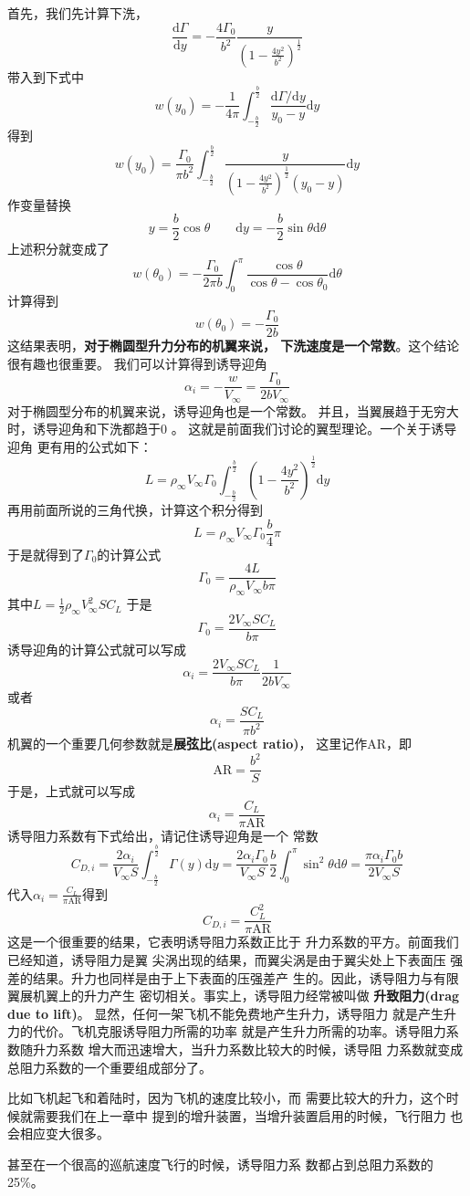 首先，我们先计算下洗，
\[
  \frac{\mathrm{d}\Gamma}{\mathrm{d}y}
  =-\frac{4\Gamma_0}{b^2}
  \frac{y}{\left(1-\frac{4y^2}{b^2}\right)^{\frac{1}{2}}}
\]
带入到下式中
\[
  w(y_0)=-\frac{1}{4\pi}
  \int _{-\frac{b}{2}}^{\frac{b}{2}}
  \frac{\mathrm{d}\Gamma / \mathrm{d}y}{y_0-y}\mathrm{d}y
\]
得到
\[
  w(y_0)=\frac{\Gamma_0}{\pi b^2}
  \int _{-\frac{b}{2}}^{\frac{b}{2}}
  \frac{y}{\left(1-\frac{4y^2}{b^2}\right)^{\frac{1}{2}}(y_0-y)}\mathrm{d}y
\]
作变量替换
\[
  y=\frac{b}{2}\cos \theta \qquad \mathrm{d}y=-\frac{b}{2}\sin \theta \mathrm{d}\theta
\]
上述积分就变成了
\[
  w(\theta_0)=-\frac{\Gamma_0}{2 \pi b }
  \int _0 ^\pi \frac{\cos \theta}{\cos \theta-\cos \theta_0}\mathrm{d} \theta
\]
计算得到
\[
  w(\theta_0)=-\frac{\Gamma_0}{2b}
\]
这结果表明，{\color{noteorange}\bfseries 对于椭圆型升力分布的机翼来说，
下洗速度是一个常数}。这个结论很有趣也很重要。
我们可以计算得到诱导迎角
\[
  \alpha_i=-\frac{w }{V_\infty }= \frac{\Gamma_0}{2 b V_\infty}
\]
对于椭圆型分布的机翼来说，诱导迎角也是一个常数。
并且，当翼展趋于无穷大时，诱导迎角和下洗都趋于0 。
这就是前面我们讨论的翼型理论。一个关于诱导迎角
更有用的公式如下：
\[
  L=\rho_\infty V_\infty \Gamma_0 
  \int _{-\frac{b}{2}}^{\frac{b}{2}}
  \left(1-\frac{4y^2}{b^2}\right)^{\frac{1}{2}}
  \mathrm{d}y
\]
再用前面所说的三角代换，计算这个积分得到
\[
  L=\rho_\infty V_\infty \Gamma_0 \frac{b}{4}\pi
\]
于是就得到了$\Gamma_0$的计算公式
\[
  \Gamma_0=\frac{4L}{\rho_\infty V_\infty b \pi}
\]
其中$L=\frac{1}{2}\rho_\infty V_\infty^2 S C_L$
于是
\[
  \Gamma_0=\frac{2V_\infty S C_L}{b \pi}
\]
诱导迎角的计算公式就可以写成
\[
  \alpha_i = \frac{2V_\infty S C_L}{b \pi} 
  \frac{1}{2b V_\infty }
\]
或者
\[
  \alpha _i =\frac{S C_L}{\pi b^2}
\]
机翼的一个重要几何参数就是{\bfseries 展弦比(aspect ratio)}，
这里记作AR，即
\[
  \mathrm{AR}=\frac{b^2}{S}
\]
于是，上式就可以写成
\[
  \alpha_i=\frac{C_L}{\pi \mathrm{AR}}
\]
诱导阻力系数有下式给出，请记住诱导迎角是一个
常数
\[
  C_{D,i}=\frac{2\alpha_i}{V_\infty S}
  \int _{-\frac{b}{2}}^{\frac{b}{2}}
  \Gamma(y)\mathrm{d}y
  =\frac{2\alpha_i \Gamma_0}{V_\infty S}
  \frac{b}{2}
  \int _0^\pi \sin^2\theta \mathrm{d}  \theta
  =\frac{\pi \alpha_i \Gamma_0 b }{2 V_\infty S}
\]
代入$\alpha_i=\frac{C_L}{\pi \mathrm{AR}}$得到
\[
  C_{D,i}=\frac{C_L^2}{\pi \mathrm{AR}}
\]
这是一个很重要的结果，它表明诱导阻力系数正比于
升力系数的平方。前面我们已经知道，诱导阻力是翼
尖涡出现的结果，而翼尖涡是由于翼尖处上下表面压
强差的结果。升力也同样是由于上下表面的压强差产
生的。因此，诱导阻力与有限翼展机翼上的升力产生
密切相关。事实上，诱导阻力经常被叫做
{\bfseries 升致阻力(drag due to lift)}。
显然，任何一架飞机不能免费地产生升力，诱导阻力
就是产生升力的代价。飞机克服诱导阻力所需的功率
就是产生升力所需的功率。诱导阻力系数随升力系数
增大而迅速增大，当升力系数比较大的时候，诱导阻
力系数就变成总阻力系数的一个重要组成部分了。
\begin{notice}
比如飞机起飞和着陆时，因为飞机的速度比较小，而
需要比较大的升力，这个时候就需要我们在上一章中
提到的增升装置，当增升装置启用的时候，飞行阻力
也会相应变大很多。
\end{notice}
甚至在一个很高的巡航速度飞行的时候，诱导阻力系
数都占到总阻力系数的25\%。

